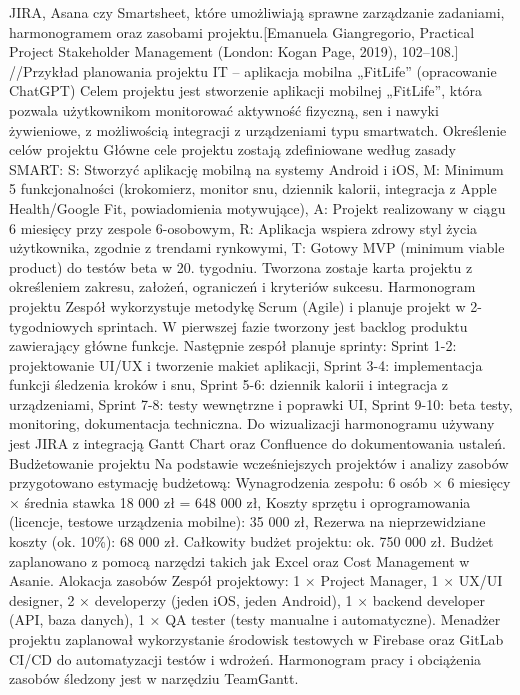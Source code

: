 JIRA, Asana czy Smartsheet, które umożliwiają sprawne zarządzanie zadaniami, harmonogramem oraz zasobami projektu.[Emanuela Giangregorio, Practical Project Stakeholder Management (London: Kogan Page, 2019), 102–108.]
//Przykład planowania projektu IT – aplikacja mobilna „FitLife” (opracowanie ChatGPT)
Celem projektu jest stworzenie aplikacji mobilnej „FitLife”, która pozwala użytkownikom monitorować aktywność fizyczną, sen i nawyki żywieniowe, z możliwością integracji z urządzeniami typu smartwatch.
Określenie celów projektu 
Główne cele projektu zostają zdefiniowane według zasady SMART:
S: Stworzyć aplikację mobilną na systemy Android i iOS,
M: Minimum 5 funkcjonalności (krokomierz, monitor snu, dziennik kalorii, integracja z Apple Health/Google Fit, powiadomienia motywujące),
A: Projekt realizowany w ciągu 6 miesięcy przy zespole 6-osobowym,
R: Aplikacja wspiera zdrowy styl życia użytkownika, zgodnie z trendami rynkowymi,
T: Gotowy MVP (minimum viable product) do testów beta w 20. tygodniu.
Tworzona zostaje karta projektu z określeniem zakresu, założeń, ograniczeń i kryteriów sukcesu.
Harmonogram projektu Zespół wykorzystuje metodykę Scrum (Agile) i planuje projekt w 2-tygodniowych sprintach. W pierwszej fazie tworzony jest backlog produktu zawierający główne funkcje. Następnie zespół planuje sprinty:
Sprint 1-2: projektowanie UI/UX i tworzenie makiet aplikacji,
Sprint 3-4: implementacja funkcji śledzenia kroków i snu,
Sprint 5-6: dziennik kalorii i integracja z urządzeniami,
Sprint 7-8: testy wewnętrzne i poprawki UI,
Sprint 9-10: beta testy, monitoring, dokumentacja techniczna.
Do wizualizacji harmonogramu używany jest JIRA z integracją Gantt Chart oraz Confluence do dokumentowania ustaleń.
Budżetowanie projektu Na podstawie wcześniejszych projektów i analizy zasobów przygotowano estymację budżetową:
Wynagrodzenia zespołu: 6 osób × 6 miesięcy × średnia stawka 18 000 zł = 648 000 zł,
Koszty sprzętu i oprogramowania (licencje, testowe urządzenia mobilne): 35 000 zł,
Rezerwa na nieprzewidziane koszty (ok. 10\%): 68 000 zł.
Całkowity budżet projektu: ok. 750 000 zł.
Budżet zaplanowano z pomocą narzędzi takich jak Excel oraz Cost Management w Asanie.
Alokacja zasobów Zespół projektowy:
1 × Project Manager,
1 × UX/UI designer,
2 × developerzy (jeden iOS, jeden Android),
1 × backend developer (API, baza danych),
1 × QA tester (testy manualne i automatyczne).
Menadżer projektu zaplanował wykorzystanie środowisk testowych w Firebase oraz GitLab CI/CD do automatyzacji testów i wdrożeń. Harmonogram pracy i obciążenia zasobów śledzony jest w narzędziu TeamGantt.
